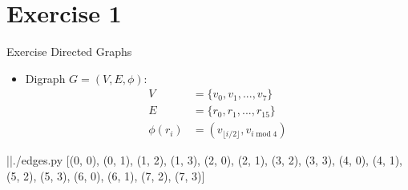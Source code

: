 
\section{Exercise 1}

\setcounter{exercise}{1}

\begin{frame}{Exercise \thesection}{Directed Graphs}
  \begin{exercisenoinc}
    \begin{itemize}
      \item Digraph $G=\left(V,E,\phi\right)$:
      \begin{align*}
        V &= \{v_0, v_1, ..., v_7\} \\
        E &= \{r_0, r_1, ..., r_{15} \} \\
        \phi(r_i) &= (v_{\lfloor i / 2\rfloor}, v_{i \; \text{mod} \; 4})
      \end{align*}
    \end{itemize}
  \end{exercisenoinc}
  \begin{requirementsnoinc}
    \centering
    \begin{minipage}{0.6\textwidth}
      \begin{linenums}
      \end{linenums}
    \end{minipage}
    \begin{terminal}
      |\prompt|./edges.py
      [(0, 0), (0, 1), (1, 2), (1, 3), (2, 0), (2, 1), (3, 2), (3, 3), 
       (4, 0), (4, 1), (5, 2), (5, 3), (6, 0), (6, 1), (7, 2), (7, 3)]
    \end{terminal}
  \end{requirementsnoinc}
  \begin{solutionnoinc}
  \end{solutionnoinc}
\end{frame}
